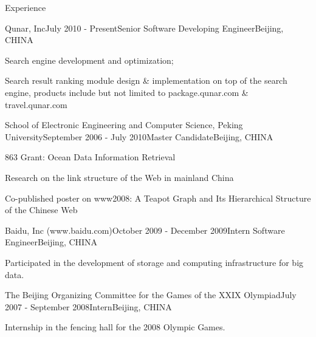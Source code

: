 \documentclass{resume} %
\begin{document}
\begin{rSection}{Experience}

\begin{rSubsection}{Qunar, Inc}{July 2010 - Present}{Senior Software Developing Engineer}{Beijing, CHINA}
\item Search engine development and optimization;
\item Search result ranking module design \& implementation on top of
  the search engine, products include but not limited to
  package.qunar.com \& travel.qunar.com
\end{rSubsection}


\begin{rSubsection}{School of Electronic Engineering and Computer
    Science, Peking University}{September 2006 - July 2010}{Master Candidate}{Beijing, CHINA}
\item 863 Grant: Ocean Data Information Retrieval
\item Research on the link structure of the Web in mainland China
\item Co-published poster on www2008: A
Teapot Graph and Its Hierarchical Structure of the Chinese Web
\end{rSubsection}


\begin{rSubsection}{Baidu, Inc (www.baidu.com)}{October 2009 - December 2009}{Intern Software Engineer}{Beijing, CHINA}
\item Participated in the development of storage and computing
  infrastructure for big data.
\end{rSubsection}

\begin{rSubsection}{The Beijing Organizing Committee for the Games of
    the XXIX Olympiad}{July 2007 - September 2008}{Intern}{Beijing, CHINA}
\item Internship in the fencing hall for the 2008 Olympic Games.
\end{rSubsection}

\end{rSection}
\end{document}
